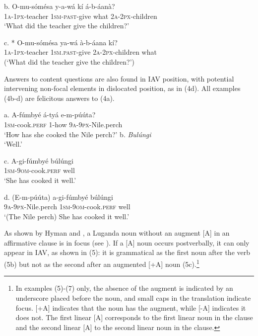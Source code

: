 \documentclass[output=paper]{langsci/langscibook}
\begin{document}
\ea
\gll b.  O-mu-sómésa  y-a-wá    kí  á-b-áanà?\\
       \textsc{1a-1px}-teacher  \textsc{1sm-past}-give  what  \textsc{2a-2px}-children\\
\glt   ‘What did the teacher give the children?’
\z

\ea
\gll c.  * O-mu-sómésa  ya-wá      à-b-áana    kí?\\
       \textsc{1a-1px}-teacher  \textsc{1sm.past-}give  \textsc{2a-2px}-children  what\\
\glt   (‘What did the teacher give the children?’)
\z

Answers to content questions are also found in IAV position, with potential intervening non-focal elements in dislocated position, as in (4d). All examples (4b-d) are felicitous answers to (4a).

\ea
\gll a.  A-fúmbyé    á-tyá    e-m-púúta?\\
     \textsc{  1sm}-cook.\textsc{perf}  1-how    \textsc{9a}-\textsc{9px}-Nile.perch\\
\glt ‘How has she cooked the Nile perch?’
\z
\ea
 b.  \textit{Bulúngi}\\
\glt  ‘Well.’
\z

\ea
\gll c.  A-gi-fúmbyé      búlúngi\\
       \textsc{1sm}-\textsc{9om}-cook.\textsc{perf}  well\\
\glt   ‘She has cooked it well.’
\z

\ea
\gll d.  (E-m-púúta)    a-gi-fúmbyé      búlúngi\\
       \textsc{9a}-\textsc{9px}-Nile.perch  \textsc{1sm}-\textsc{9om}-cook.\textsc{perf}  well\\
\glt   ‘(The Nile perch) She has cooked it well.’
\z

As shown by Hyman and \citet{Katamba1993}, a Luganda noun without an augment [A] in an affirmative clause is in focus (see ). If a [A] noun occurs postverbally, it can only appear in IAV, as shown in (5): it is grammatical as the first noun after the verb (5b) but not as the second after an augmented [+A] noun (5c).\footnote{In examples (5)-(7) only, the absence of the augment is indicated by an underscore placed before the noun, and small caps in the translation indicate focus. [+A] indicates that the noun has the augment, while [-A] indicates it does not.  The first linear [A] corresponds to the first linear noun in the clause and the second linear [A] to the second linear noun in the clause.} 
\end{document}
